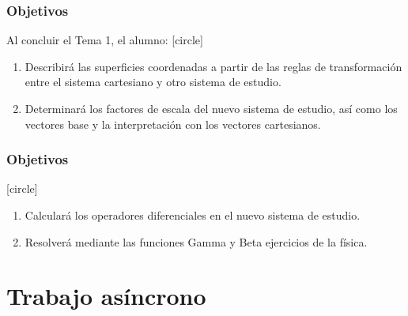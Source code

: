 \documentclass[12pt]{beamer}
\begin{document}
\begin{frame}
\frametitle{Objetivos}
Al concluir el Tema 1, el alumno:
[circle]
\begin{enumerate}[<+->]
\item Describirá las superficies coordenadas a partir de las reglas de transformación entre el sistema cartesiano y otro sistema de estudio.
\item Determinará los factores de escala del nuevo sistema de estudio, así como los vectores base y la interpretación con los vectores cartesianos.
\seti
\end{enumerate}
\end{frame}
\begin{frame}
\frametitle{Objetivos}
[circle]
\begin{enumerate}[<+->]
\conti
\item Calculará los operadores diferenciales en el nuevo sistema de estudio.
\item Resolverá mediante las funciones Gamma y Beta ejercicios de la física.
\end{enumerate}
\end{frame}
\section{Trabajo asíncrono}
\end{document}
